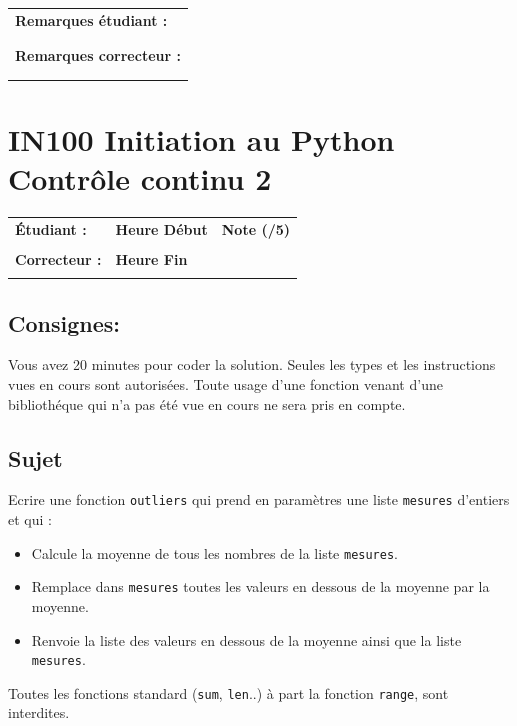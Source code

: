 \documentclass[a4paper,11pt]{article}
\begin{document}
\begin{table}[h!]
\centering
\renewcommand{\arraystretch}{1.4} %
\begin{tabular}{|p{15cm}|}
\hline
\textbf{Remarques étudiant :}    \\
 \\
 \\
\hline
\textbf{Remarques correcteur :}  \\
 \\
 \\
\hline
\end{tabular}
\end{table}


\newpage

\section*{\center IN100 Initiation au Python\\
Contrôle continu 2}


\begin{table}[h!]
\centering
\renewcommand{\arraystretch}{1.4} %
\begin{tabular}{|p{10cm}|p{3cm}|p{2cm}|}
\hline
\textbf{Étudiant :} & \textbf{Heure Début }  & \textbf{Note (/5) }  \\
& & \\
\hline
\textbf{Correcteur :} & \textbf{Heure Fin } & \\
& & \\
\hline

\hline
\end{tabular}
\end{table}

\subsection*{Consignes:} Vous avez 20 minutes pour coder la solution. Seules les types et les instructions vues en cours sont autorisées. Toute usage d'une fonction 
venant d'une bibliothéque qui n'a pas été vue en cours ne sera pris en compte. 



\subsection*{Sujet}



Ecrire une fonction \texttt{outliers} qui prend en paramètres une liste \texttt{mesures} d’entiers et qui :
\begin{itemize}
\item[1.] Calcule la moyenne de tous les nombres de la liste \texttt{mesures}.
\item[2.] Remplace dans \texttt{mesures} toutes les valeurs en dessous de la moyenne par la moyenne.
\item[3.] Renvoie la liste des valeurs en dessous de la moyenne ainsi que la liste \texttt{mesures}. 
\end{itemize}
Toutes les fonctions standard (\texttt{sum}, \texttt{len}..) à part la fonction \texttt{range}, sont interdites.
\end{document}
